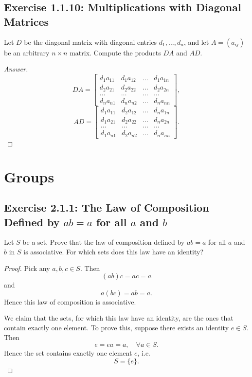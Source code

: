 \documentclass{amsbook}
\theoremstyle{definition}
\theoremstyle{remark}
\numberwithin{section}{chapter}
\numberwithin{equation}{chapter}
\begin{document}
\section{Exercise 1.1.10: Multiplications with Diagonal Matrices}
Let $D$ be the diagonal matrix with diagonal entries $d_1, \dots, d_n$, and let $A=(a_{ij})$ be an arbitrary $n\times n$ matrix. Compute the products $DA$ and $AD$.
\begin{proof}[Answer]
\[
DA=\begin{bmatrix}
d_1a_{11} & d_1a_{12} & \dots & d_1a_{1n}\\
d_2a_{21} & d_2a_{22} & \dots & d_2a_{2n}\\
\dots & \dots & \dots & \dots\\
d_na_{n1} & d_na_{n2} & \dots & d_na_{nn}
\end{bmatrix},
\]
\[
AD=\begin{bmatrix}
d_1a_{11} & d_2a_{12} & \dots & d_na_{1n}\\
d_1a_{21} & d_2a_{22} & \dots & d_na_{2n}\\
\dots & \dots & \dots & \dots\\
d_1a_{n1} & d_2a_{n2} & \dots & d_na_{nn}
\end{bmatrix}.
\]
\end{proof}

\chapter{Groups}
\section{Exercise 2.1.1: The Law of Composition Defined by $ab=a$ for all $a$ and $b$}
Let $S$ be a set. Prove that the law of composition defined by $ab=a$ for all $a$ and $b$ in $S$ is associative. For which sets does this law have an identity?
\begin{proof}
Pick any $a,b,c\in S$. Then\[
(ab)c=ac=a
\]and\[
a(bc)=ab=a.
\]Hence this law of composition is associative.

We claim that the sets, for which this law have an identity, are the ones that contain exactly one element. To prove this, suppose there exists an identity $e\in S$. Then\[
e=ea=a,\quad\forall a\in S.
\]Hence the set contains exactly one element $e$, i.e.\[
S=\{e\}.
\]
\end{proof}
\end{document}
